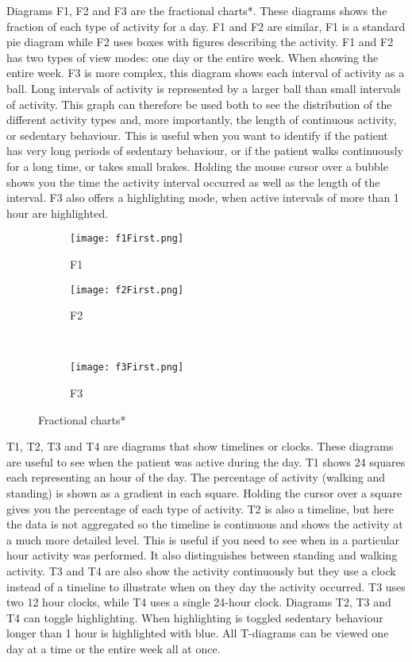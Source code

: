Diagrams F1, F2 and F3 are the fractional charts*. These diagrams shows the fraction of each type of activity for a day. F1 and F2 are similar, F1 is a standard pie diagram while F2 uses boxes with figures describing the activity. F1 and F2 has two types of view modes: one day or the entire week. When showing the entire week. F3 is more complex, this diagram shows each interval of activity as a ball. Long intervals of activity is represented by a larger ball than small intervals of activity. This graph can therefore be used both to see the distribution of the different activity types and, more importantly, the length of continuous activity, or sedentary behaviour. This is useful when you want to identify if the patient has very long periods of sedentary behaviour, or if the patient walks continuously for a long time, or takes small brakes. Holding the mouse cursor over a bubble shows you the time the activity interval occurred as well as the length of the interval. F3 also offers a highlighting mode, when active intervals of more than 1 hour are highlighted.

\begin{figure}[h!]
  \centering
  \begin{subfigure}[b]{0.45\textwidth}
    \centering
    \texttt{[image: f1First.png]}
    \caption{F1}
  \end{subfigure}
  \begin{subfigure}[b]{0.45\textwidth}
    \centering
    \texttt{[image: f2First.png]}
    \caption{F2}
  \end{subfigure}
  \\
  \begin{subfigure}[b]{0.45\textwidth}
    \centering
    \texttt{[image: f3First.png]}
    \caption{F3}
  \end{subfigure}
  \caption{Fractional charts*}
\end{figure}

T1, T2, T3 and T4 are diagrams that show timelines or clocks. These diagrams are useful to see when the patient was active during the day. T1 shows 24 squares each representing an hour of the day. The percentage of activity (walking and standing) is shown as a gradient in each square. Holding the cursor over a square gives you the percentage of each type of activity. T2 is also a timeline, but here the data is not aggregated so the timeline is continuous and shows the activity at a much more detailed level. This is useful if you need to see when in a particular hour activity was performed. It also distinguishes between standing and walking activity. T3 and T4 are also show the activity continuously but they use a clock instead of a timeline to illustrate when on they day the activity occurred. T3 uses two 12 hour clocks, while T4 uses a single 24-hour clock. Diagrams T2, T3 and T4 can toggle highlighting. When highlighting is toggled sedentary behaviour longer than 1 hour is highlighted with blue. All T-diagrams can be viewed one day at a time or the entire week all at once. 

